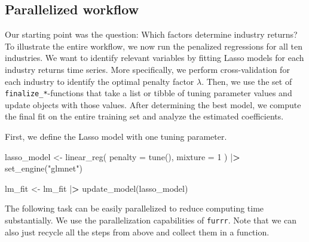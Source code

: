 \documentclass[
]{book}
\newenvironment{Shaded}{\begin{snugshade}}{\end{snugshade}}
\newcommand{\AttributeTok}[1]{\textcolor[rgb]{0.61,0.61,0.61}{#1}}
\newcommand{\DecValTok}[1]{\textcolor[rgb]{0.06,0.06,0.06}{#1}}
\newcommand{\ErrorTok}[1]{\textcolor[rgb]{0.14,0.14,0.14}{\textbf{#1}}}
\newcommand{\FunctionTok}[1]{\textcolor[rgb]{0,0,0}{#1}}
\newcommand{\NormalTok}[1]{#1}
\newcommand{\OtherTok}[1]{\textcolor[rgb]{0.37,0.37,0.37}{#1}}
\newcommand{\SpecialCharTok}[1]{\textcolor[rgb]{0,0,0}{#1}}
\newcommand{\StringTok}[1]{\textcolor[rgb]{0.5,0.5,0.5}{#1}}
\begin{document}
\hypertarget{parallelized-workflow}{%
\subsection{Parallelized workflow}\label{parallelized-workflow}}

Our starting point was the question: Which factors determine industry returns? To illustrate the entire workflow, we now run the penalized regressions for all ten industries. We want to identify relevant variables by fitting Lasso models for each industry returns time series. More specifically, we perform cross-validation for each industry to identify the optimal penalty factor \(\lambda\). Then, we use the set of \texttt{finalize\_*}-functions that take a list or tibble of tuning parameter values and update objects with those values. After determining the best model, we compute the final fit on the entire training set and analyze the estimated coefficients.

First, we define the Lasso model with one tuning parameter.

\begin{Shaded}
\begin{Highlighting}[]
\NormalTok{lasso\_model }\OtherTok{\textless{}{-}} \FunctionTok{linear\_reg}\NormalTok{(}
  \AttributeTok{penalty =} \FunctionTok{tune}\NormalTok{(),}
  \AttributeTok{mixture =} \DecValTok{1}
\NormalTok{) }\SpecialCharTok{|}\ErrorTok{\textgreater{}}
  \FunctionTok{set\_engine}\NormalTok{(}\StringTok{"glmnet"}\NormalTok{)}

\NormalTok{lm\_fit }\OtherTok{\textless{}{-}}\NormalTok{ lm\_fit }\SpecialCharTok{|}\ErrorTok{\textgreater{}}
  \FunctionTok{update\_model}\NormalTok{(lasso\_model)}
\end{Highlighting}
\end{Shaded}

The following task can be easily parallelized to reduce computing time substantially. We use the parallelization capabilities of \texttt{furrr}. Note that we can also just recycle all the steps from above and collect them in a function.
\end{document}
